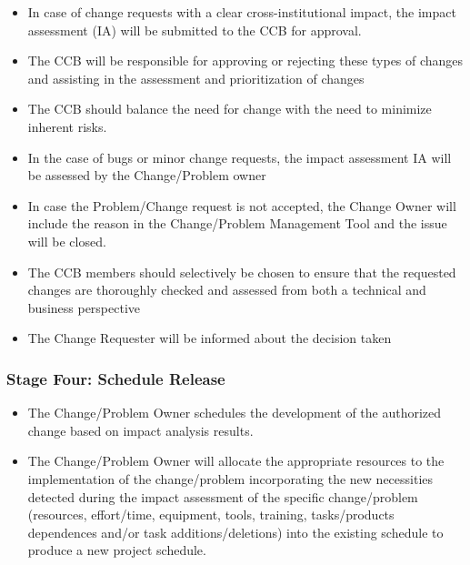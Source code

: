 \documentclass{template/openetcs_article}
\begin{document}
\begin{itemize}
\item In case of change requests with a clear cross-institutional impact, the impact assessment (IA) will be submitted to the CCB for approval.
\item The CCB will be responsible for approving or rejecting these types of changes and assisting in the assessment and prioritization of changes
\item The CCB should balance the need for change with the need to minimize inherent risks.
\item In the case of bugs or minor change requests, the impact assessment IA will be assessed by the Change/Problem owner
\item In case the Problem/Change request is not accepted, the Change Owner will include the reason in the Change/Problem Management Tool and the issue will be closed. 
\item The CCB members should selectively be chosen to ensure that the requested changes are thoroughly checked and assessed from both a technical and business perspective
\item The Change Requester will be informed about the decision taken
\end{itemize}

\subsubsection{Stage Four: Schedule Release}
\begin{itemize}
\item The Change/Problem Owner schedules the development of the authorized change based on impact analysis results.
\item The Change/Problem Owner will allocate the appropriate resources to the implementation of the change/problem incorporating the new necessities detected during the impact assessment of the specific change/problem (resources, effort/time, equipment, tools, training, tasks/products dependences and/or task additions/deletions) into the existing schedule to produce a new project schedule.
\end{itemize}
\end{document}
